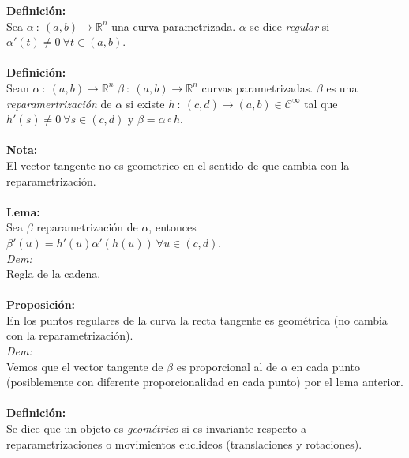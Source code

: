 \documentclass{article}
\begin{document}

\textbf{Definición:}\\
Sea $\alpha\::\:(a,b)\longrightarrow\mathbb{R}^n$ una curva parametrizada. $\alpha$ se dice \textit{regular} si $\alpha'(t)\ne0 \: \forall t \in(a,b)$.\\\\


\textbf{Definición:}\\
Sean $\alpha\::\:(a,b)\longrightarrow\mathbb{R}^n$ $\beta\::\:(a,b)\longrightarrow\mathbb{R}^n$ curvas parametrizadas. $\beta$ es una \textit{reparamertrización} de $\alpha$ si existe $h\::\:(c,d)\longrightarrow(a,b)\in \mathcal{C}^\infty$ tal que $h'(s)\ne 0 \: \forall s\in (c,d)$ y $\beta=\alpha\circ h$.\\\\%



\textbf{Nota:}\\
El vector tangente no es geometrico en el sentido de que cambia con la reparametrización.\\\\


\textbf{Lema:}\\
Sea $\beta$ reparametrización de $\alpha$, entonces $\beta'(u)=h'(u)\alpha'(h(u))\:\forall u\in(c,d)$.\\
\textit{Dem:}\\
Regla de la cadena.\\\\


\textbf{Proposición:}\\
En los puntos regulares de la curva la recta tangente es geométrica (no cambia con la reparametrización).\\
\textit{Dem:}\\
Vemos que el vector tangente de $\beta$ es proporcional al de $\alpha$ en cada punto (posiblemente con diferente proporcionalidad en cada punto) por el lema anterior.\\\\


\textbf{Definición:}\\
Se dice que un objeto es \textit{geométrico} si es invariante respecto a reparametrizaciones o movimientos euclideos (translaciones y rotaciones).
\end{document}
